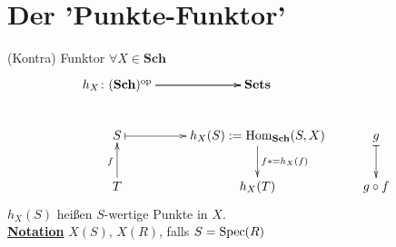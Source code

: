 \section{Der 'Punkte-Funktor'}
(Kontra) Funktor $\forall X \in \textbf{Sch}$
\[
\xymatrix{
	h_X\colon (\textbf{Sch})^\text{op} \ar@{->}[r] \ar@{->}[r]  &  \textbf{Sets}&\\
	S  \ar@{|->}[r] & h_X(S):= \Hom_{\textbf{Sch}}(S,X)\ar@{->}[d]^{f*=h_X(f)}& g \ar@{|->}[d]\\
	T  \ar@{->}[u]^{f} & h_X(T) & g \circ f
}
\]
$h_X(S)$ heißen $S$-wertige Punkte in $X$.\\
\textbf{\underline{Notation}} $X(S)$, $X(R)$, falls $S= \operatorname{Spec}(R)$ 
